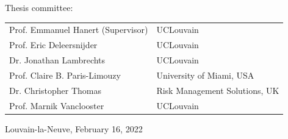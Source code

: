 \vspace*{1.5cm}
\begin{minipage}{\textwidth}
\begin{center}

\large Thesis committee:\\

\vspace*{0.5cm}
\footnotesize{
\hspace{-1cm}
\begin{tabular}{ll}
Prof. Emmanuel Hanert (Supervisor) & UCLouvain \\
Prof. Eric Deleersnijder           & UCLouvain\\
Dr. Jonathan Lambrechts            & UCLouvain \\
Prof. Claire B. Paris-Limouzy      & University of Miami, USA \\
Dr. Christopher Thomas             & Risk Management Solutions, UK \\
Prof. Marnik Vanclooster           & UCLouvain
\end{tabular}
}
\end{center}
\end{minipage}

\vspace*{.5cm}
\begin{minipage}{\textwidth}
\centering
\large Louvain-la-Neuve, February 16, 2022
\end{minipage}
